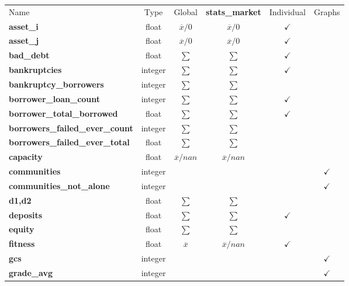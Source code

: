 \documentclass{article}
\begin{document}
\begin{table}[h]
\centering
\begin{tabular}{|l|c|c|c|c|c|}
\hline
Name & Type & Global & \textbf{stats\_market} & Individual & Graphs \\
\textbf{asset\_i}          & float & $\overline{x}/0 $ & $\overline{x}/0$ & $\checkmark$ &  \\
\textbf{asset\_j}          & float & $\overline{x}/0 $ & $\overline{x}/0$ & $\checkmark$ &  \\
\textbf{bad\_debt}         & float & $ \sum$ &  $ \sum$ & $\checkmark$ & \\
\textbf{bankruptcies}      & integer & $ \sum$ &  $ \sum$ & $\checkmark$ &  \\
\textbf{bankruptcy\_borrowers} & integer & $ \sum$ &  $ \sum$ &  &  \\
\textbf{borrower\_loan\_count} & integer & $ \sum$ &  $ \sum$ & $\checkmark$ &  \\
\textbf{borrower\_total\_borrowed} & float & $ \sum$ &  $ \sum$ & $\checkmark$ &  \\
\textbf{borrowers\_failed\_ever\_count} & integer & $ \sum$ &  $ \sum$ &  &  \\
\textbf{borrowers\_failed\_ever\_total} & float & $ \sum$ &  $ \sum$ &  &  \\
\textbf{capacity}                 & float &  $\overline{x}/nan $ & $\overline{x}/nan $ &  &  \\
\textbf{communities} & integer &  &   &  & $\checkmark$\\
\textbf{communities\_not\_alone} & integer &  &   &  & $\checkmark$ \\
\textbf{d1,d2}            & float &  $\sum$ & $\sum$ &  &  \\
\textbf{deposits}          & float & $ \sum$ &  $ \sum$ & $\checkmark$ &  \\
\textbf{equity}            & float &  $ \sum$ &  $ \sum$ &  & \\
\textbf{fitness}           & float & $\overline{x}$ & $\overline{x}/nan $ &  $\checkmark$  & \\
\textbf{gcs}               & integer &  &   &  & $\checkmark$ \\
\textbf{grade\_avg}        & integer &  &   &  & $\checkmark$\\


\end{tabular}
\end{table}
\end{document}
